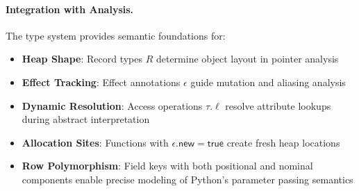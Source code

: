 \paragraph{Integration with Analysis.} The type system provides semantic foundations for:
\begin{itemize}
\item \textbf{Heap Shape}: Record types $R$ determine object layout in pointer analysis
\item \textbf{Effect Tracking}: Effect annotations $\epsilon$ guide mutation and aliasing analysis  
\item \textbf{Dynamic Resolution}: Access operations $\tau.\ell$ resolve attribute lookups during abstract interpretation
\item \textbf{Allocation Sites}: Functions with $\epsilon.\mathsf{new} = \mathsf{true}$ create fresh heap locations
\item \textbf{Row Polymorphism}: Field keys with both positional and nominal components enable precise modeling of Python's parameter passing semantics
\end{itemize}
